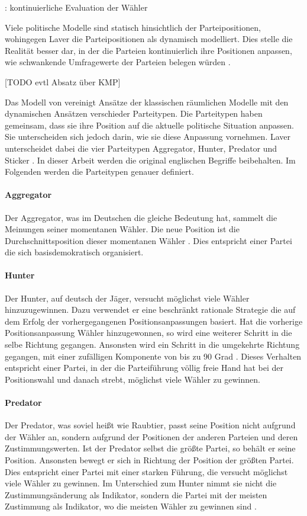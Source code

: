 \citet{laver2005policy}: kontinuierliche Evaluation der Wähler

Viele politische Modelle sind statisch hinsichtlich der Parteipositionen, wohingegen Laver die Parteipositionen als dynamisch modelliert. Dies stelle die Realität besser dar, in der die Parteien kontinuierlich ihre Positionen anpassen, wie schwankende Umfragewerte der Parteien belegen würden \citep[S.\,263-4]{laver2005policy}.

[TODO evtl Absatz über KMP]

Das Modell von \citet{laver2005policy} vereinigt Ansätze der klassischen räumlichen Modelle mit den dynamischen Ansätzen verschieder Parteitypen. Die Parteitypen haben gemeinsam, dass sie ihre Position auf die aktuelle politische Situation anpassen. Sie unterscheiden sich jedoch darin, wie sie diese Anpassung vornehmen. Laver unterscheidet dabei die vier Parteitypen Aggregator, Hunter, Predator und Sticker \citep[S.\,266-7]{laver2005policy}. In dieser Arbeit werden die original englischen Begriffe beibehalten. Im Folgenden werden die Parteitypen genauer definiert.

\paragraph{Aggregator} Der Aggregator, was im Deutschen die gleiche Bedeutung hat, sammelt die Meinungen seiner momentanen Wähler. Die neue Position ist die Durchschnittsposition dieser momentanen Wähler \citep[S.\,267]{laver2005policy}. Dies entspricht einer Partei die sich basisdemokratisch organisiert.

\paragraph{Hunter} Der Hunter, auf deutsch der Jäger, versucht möglichst viele Wähler hinzuzugewinnen. Dazu verwendet er eine beschränkt rationale Strategie die auf dem Erfolg der vorhergegangenen Positionsanpassungen basiert. Hat die vorherige Positionsanpassung Wähler hinzugewonnen, so wird eine weiterer Schritt in die selbe Richtung gegangen. Ansonsten wird ein Schritt in die umgekehrte Richtung gegangen, mit einer zufälligen Komponente von bis zu 90 Grad \citep[S.\,267]{laver2005policy}. Dieses Verhalten entspricht einer Partei, in der die Parteiführung völlig freie Hand hat bei der Positionswahl und danach strebt, möglichst viele Wähler zu gewinnen.

\paragraph{Predator} Der Predator, was soviel heißt wie Raubtier, passt seine Position nicht aufgrund der Wähler an, sondern aufgrund der Positionen der anderen Parteien und deren Zustimmungswerten. Ist der Predator selbst die größte Partei, so behält er seine Position. Ansonsten bewegt er sich in Richtung der Position der größten Partei. Dies entspricht einer Partei mit einer starken Führung, die versucht möglichst viele Wähler zu gewinnen. Im Unterschied zum Hunter nimmt sie nicht die Zustimmungsänderung als Indikator, sondern die Partei mit der meisten Zustimmung als Indikator, wo die meisten Wähler zu gewinnen sind \citep[S.\,267]{laver2005policy}.

